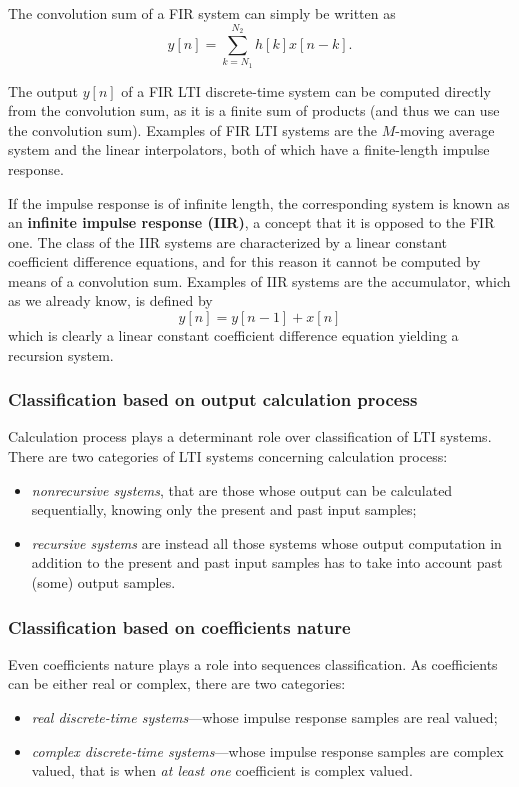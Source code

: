 \documentclass[\documentfontsize, twocolumn]{\classname}
\begin{document}
The convolution sum of a FIR system can simply be written as
\begin{equation}\label{eqn:finiteImpulseResponseEquation}
    y[n]=\sum_{k=N_1}^{N_2} h[k]x[n-k].
\end{equation}

The output $y[n]$ of a FIR LTI discrete-time system can be computed directly from the convolution sum, as it is a finite sum of products (and thus we can use the convolution sum). Examples of FIR LTI systems are the $M$-moving average system and the linear interpolators, both of which have a finite-length impulse response.

If the impulse response is of infinite length, the corresponding system is known as an \textbf{infinite impulse response (IIR)}, a concept that it is opposed to the FIR one. The class of the IIR systems are characterized by a linear constant coefficient difference equations, and for this reason it cannot be computed by means of a convolution sum. Examples of IIR systems are the accumulator, which as we already know, is defined by
\[
    y[n] = y[n-1] + x[n]
\]
which is clearly a linear constant coefficient difference equation yielding a recursion system.

\subsubsection{Classification based on output calculation process}
Calculation process plays a determinant role over classification of LTI systems. There are two categories of LTI systems concerning calculation process:
\begin{itemize}
    \item \emph{nonrecursive systems}, that are those whose output can be calculated sequentially, knowing only the present and past input samples;
    \item \emph{recursive systems} are instead all those systems whose output computation in addition to the present and past input samples has to take into account past (some) output samples.
\end{itemize}

\subsubsection{Classification based on coefficients nature}
Even coefficients nature plays a role into sequences classification. As coefficients can be either real or complex, there are two categories:
\begin{itemize}
    \item \emph{real discrete-time systems}---whose impulse response samples are real valued;
    \item \emph{complex discrete-time systems}---whose impulse response samples are complex valued, that is when \emph{at least one} coefficient is complex valued.
\end{itemize}
\end{document}
